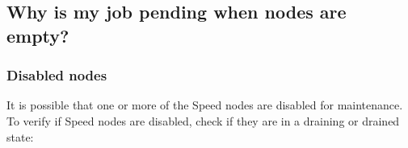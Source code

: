 \subsection{Why is my job pending when nodes are empty?}

\subsubsection{Disabled nodes}
It is possible that one or more of the Speed nodes are disabled for maintenance.
To verify if Speed nodes are disabled, check if they are in a draining or drained state:


